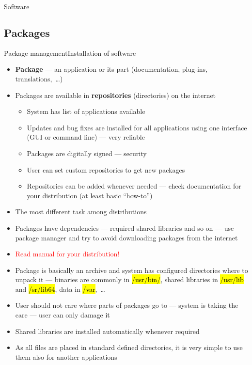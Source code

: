 \documentclass[compress, ucs, xelatex, 11pt, xcolor=svgnames,
  hyperref={
    bookmarks=true,
    unicode=true,
    colorlinks=true,
    pdftitle={Linux, command line and MetaCentrum},
    plainpages=false,
    pdfauthor={Vojtech Zeisek},
    pdfsubject={Course about use of Linux command line, writing shell scripts and using MetaCentrum of CESNET},
    pdfcreator={XeLaTeX},
    pdfkeywords={Linux, GNU, BASH, shell, command line, MetaCentrum},
    linkcolor=DarkRed,
    anchorcolor=DarkBlue,
    citecolor=Indigo,
    filecolor=NavyBlue,
    menucolor=DarkMagenta,
    urlcolor=DarkBlue,
    pdftex},
  url={hyphens, lowtilde} %
  ]{beamer}
\renewcommand{\texttt}[1]{\hl{\ttfamily #1}}
\renewcommand{\alert}[1]{\textcolor{red}{#1}}
\begin{document}
\begin{frame}{Software}
  \tableofcontents[currentsection, sectionstyle=show/hide, hideothersubsections]
\end{frame}

\subsection{Packages}

\begin{frame}[allowframebreaks]{Package management}{Installation of software}
  \begin{itemize}
    \item \textbf{Package} --- an application or its part (documentation, plug-ins, translations,~\ldots)
    \item Packages are available in \textbf{repositories} (directories) on the internet
    \begin{itemize}
      \item System has list of applications available
      \item Updates and bug fixes are installed for all applications using one interface (GUI or command line) --- very reliable
      \item Packages are digitally signed --- security
      \item User can set custom repositories to get new packages
      \item Repositories can be added whenever needed --- check documentation for your distribution (at least basic ``how-to'')
    \end{itemize}
    \item The most different task among distributions
    \item Packages have dependencies --- required shared libraries and so on --- use package manager and try to avoid downloading packages from the internet
    \item \alert{Read manual for your distribution!}
    \item Package is basically an archive and system has configured directories where to unpack it --- binaries are commonly in \texttt{/usr/bin/}, shared libraries in \texttt{/usr/lib} and \texttt{/sr/lib64}, data in \texttt{/var},~\ldots
    \item User should not care where parts of packages go to --- system is taking the care --- user can only damage it
    \item Shared libraries are installed automatically whenever required
    \item As all files are placed in standard defined directories, it is very simple to use them also for another applications

\end{itemize}
\end{frame}
\end{document}
